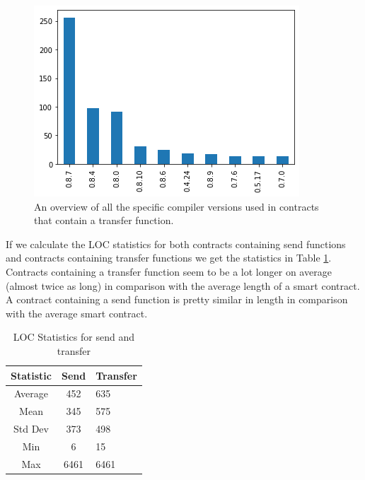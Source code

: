 \documentclass[10pt,conference]{IEEEtran}
\begin{document}
\begin{figure}[h]
  \centering
  \includegraphics[width=\linewidth]{img/transfer_versions_clean.png}
  \caption{An overview of all the specific compiler versions used in contracts that contain a transfer function. }
  \label{fig:transfer_version}
\end{figure}

If we calculate the LOC statistics for both contracts containing send functions and contracts containing transfer functions we get the statistics in Table \ref{tab:loc}. Contracts containing a transfer function seem to be a lot longer on average (almost twice as long) in comparison with the average length of a smart contract. A contract containing a send function is pretty similar in length in comparison with the average smart contract.
\begin{table}
  \caption{LOC Statistics for send and transfer}
  \label{tab:loc}
  \begin{tabular}{ccl}
    \hline
    Statistic & Send & Transfer\\
    \hline
    Average&452&635\\
    Mean&345&575\\
    Std Dev&373&498\\
    Min&6&15\\
    Max&6461&6461\\
  \hline
\end{tabular}
\end{table}
\end{document}
